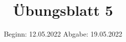 

\title{Übungsblatt 5}
\date{%
  Beginn: 12.05.2022
  \hspace{3em}
  Abgabe: 19.05.2022
}



\maketitle
\thispagestyle{empty}
\tableofcontents
\newpage






